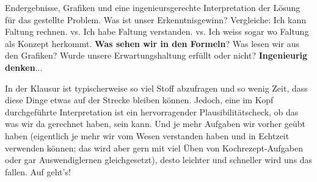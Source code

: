 \begin{Loesung}
Endergebnisse, Grafiken und eine ingenieursgerechte Interpretation der Lösung
für das gestellte Problem.
%
Was ist unser Erkenntnisgewinn?
%
Vergleiche: Ich kann Faltung rechnen. vs. Ich habe Faltung verstanden. vs. Ich weiss sogar wo Faltung als Konzept herkommt.
%
\textbf{Was sehen wir in den Formeln}?
%
Was lesen wir aus den Grafiken?
%
Wurde unsere Erwartungshaltung erfüllt oder nicht? \textbf{Ingenieurig denken}...

In der Klausur ist typischerweise so viel Stoff abzufragen und so wenig Zeit,
dass diese Dinge etwas auf der Strecke bleiben können. Jedoch, eine im Kopf
durchgeführte Interpretation ist ein hervorragender Plausibilitätscheck, ob das was
wir da gerechnet haben, sein kann. Und je mehr Aufgaben wir
vorher geübt haben (eigentlich je mehr wir vom Wesen verstanden haben und in
Echtzeit verwenden können; das wird aber gern mit viel Üben von Kochrezept-Aufgaben oder gar
Auswendiglernen gleichgesetzt),
desto leichter und schneller wird uns das fallen.
%
Auf geht's!
\end{Loesung}
